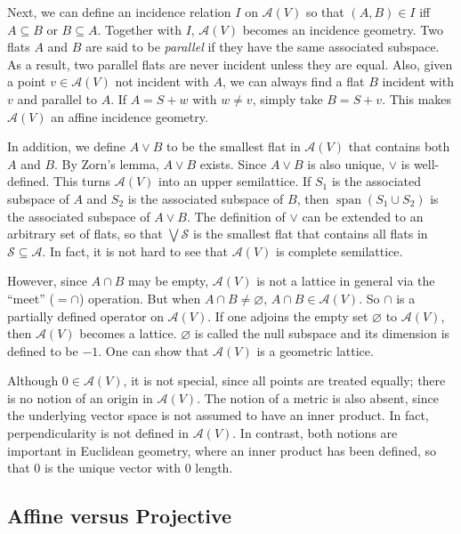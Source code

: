 \documentclass[12pt]{article}
\begin{document}
Next, we can define an incidence relation $I$ on $\mathcal{A}(V)$ so that $(A,B)\in I$ iff $A\subseteq B$ or $B\subseteq A$.  Together with $I$, $\mathcal{A}(V)$ becomes an incidence geometry.  Two flats $A$ and $B$ are said to be \emph{parallel} if they have the same associated subspace.  As a result, two parallel flats are never incident unless they are equal.  Also, given a point $v\in \mathcal{A}(V)$ not incident with $A$, we can always find a flat $B$ incident with $v$ and parallel to $A$.  If $A=S+w$ with $w\neq v$, simply take $B=S+v$.  This makes $\mathcal{A}(V)$ an affine incidence geometry.

In addition, we define $A\vee B$ to be the smallest flat in $\mathcal{A}(V)$ that contains both $A$ and $B$.  By Zorn's lemma, $A\vee B$ exists.  Since $A\vee B$ is also unique, $\vee$ is well-defined.  This turns $\mathcal{A}(V)$ into an upper semilattice.  If $S_1$ is the associated subspace of $A$ and $S_2$ is the associated subspace of $B$, then $\operatorname{span}(S_1\cup S_2)$ is the associated subspace of $A\vee B$.  The definition of $\vee$ can be extended to an arbitrary set of flats, so that $\bigvee \mathcal{S}$ is the smallest flat that contains all flats in $\mathcal{S}\subseteq\mathcal{A}$.  In fact, it is not hard to see that $\mathcal{A}(V)$ is complete semilattice.

However, since $A\cap B$ may be empty, $\mathcal{A}(V)$ is not a lattice in general via the ``meet'' ($=\cap$) operation.  But when $A\cap B\neq \varnothing$, $A\cap B\in \mathcal{A}(V)$.  So $\cap$ is a partially defined operator on $\mathcal{A}(V)$.  If one adjoins the empty set $\varnothing$ to $\mathcal{A}(V)$, then $\mathcal{A}(V)$ becomes a lattice.  $\varnothing$ is called the null subspace and its dimension is defined to be $-1$.  One can show that $\mathcal{A}(V)$ is a geometric lattice.

Although $0\in \mathcal{A}(V)$, it is not special, since all points are treated equally; there is no notion of an origin in $\mathcal{A}(V)$.  The notion of a metric is also absent, since the underlying vector space is not assumed to have an inner product.  In fact, perpendicularity is not defined in $\mathcal{A}(V)$.  In contrast, both notions are important in Euclidean geometry, where an inner product has been defined, so that $0$ is the unique vector with $0$ length.

\subsection*{Affine versus Projective}
\end{document}
